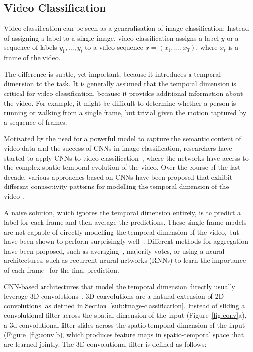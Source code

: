 \documentclass[a4paper]{article}
\begin{document}
\subsection{Video Classification}
\label{sub:video-classification}

Video classification can be seen as a generalisation of image classification:
Instead of assigning a label to a single image, video classification assigns a
label $y$ or a sequence of labels $y_1, \ldots, y_t$ to a video sequence $x =
(x_1, \ldots, x_T)$, where $x_t$ is a frame of the video.

The difference is subtle, yet important, because it introduces a temporal
dimension to the task. It is generally assumed that the temporal dimension
is critical for video classification, because it provides additional
information about the video. For example, it might be difficult to determine
whether a person is running or walking from a single frame, but trivial given
the motion captured by a sequence of frames.

Motivated by the need for a powerful model to capture the semantic content of
video data and the success of CNNs in image classification, researchers have
started to apply CNNs to video classification~\cite{videocnn, i3d, c3d, x3d,
slowfast}, where the networks have access to the complex spatio-temporal
evolution of the video. Over the course of the last decade, various approaches
based on CNNs have been proposed that exhibit different connectivity patterns
for modelling the temporal dimension of the video~\cite{videocnn}.

A naive solution, which ignores the temporal dimension entirely, is to predict a
label for each frame and then average the predictions. These single-frame models
are not capable of directly modelling the temporal dimension of the video, but
have been shown to perform surprisingly well~\cite{videocnn}. Different methods
for aggregation have been proposed, such as averaging~\cite{videocnn}, majority
votes, or using a neural architectures, such as recurrent neural networks (RNNs)
to learn the importance of each frame~\cite{lrcn} for the final
prediction.

CNN-based architectures that model the temporal dimension directly usually
leverage 3D convolutions~\cite{c3d, i3d}. 3D convolutions are a natural
extension of 2D convolutions, as defined in
Section~\ref{sub:image-classification}. Instead of sliding a convolutional
filter across the spatial dimension of the input (Figure~\ref{fig:conv}a), a
3d-convolutional filter slides across the spatio-temporal dimension of the input
(Figure~\ref{fig:conv}b), which produces feature maps in spatio-temporal space
that are learned jointly. The 3D convolutional filter is defined as follows:
\end{document}

